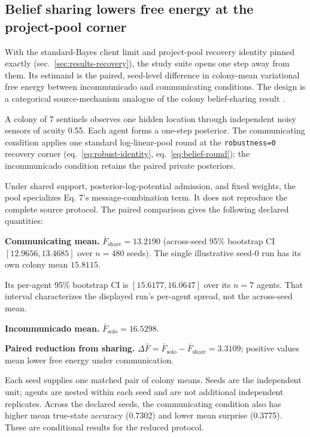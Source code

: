 \documentclass[
  english,
]{article}
\theoremstyle{plain}
\theoremstyle{definition}
\theoremstyle{remark}
\theoremstyle{definition}
\begin{document}
\subsection{Belief sharing lowers free energy at the project-pool
corner}\label{sec:results-belief_sharing}

With the standard-Bayes client limit and project-pool recovery identity
pinned exactly (sec.~\ref{sec:results-recovery}), the study suite opens
one step away from them. Its estimand is the paired, seed-level
difference in colony-mean variational free energy between incommunicado
and communicating conditions. The design is a categorical
source-mechanism analogue of the colony belief-sharing result
\citep{friston2024federated}.

A colony of 7 sentinels observes one hidden location through independent
noisy sensors of acuity 0.55. Each agent forms a one-step posterior. The
communicating condition applies one standard log-linear-pool round at
the \texttt{robustness=0} recovery corner (eq.~\ref{eq:robust-identity},
eq.~\ref{eq:belief-round}); the incommunicado condition retains the
paired private posteriors.

Under shared support, posterior-log-potential admission, and fixed
weights, the pool specializes Eq. 7's message-combination term. It does
not reproduce the complete source protocol. The paired comparison gives
the following declared quantities:

\textbf{Communicating mean.} \(\bar F_{\text{share}} = 13.2190\)
(across-seed 95\% bootstrap CI \([12.9656, 13.4685]\) over \(n = 480\)
seeds). The single illustrative seed-0 run has its own colony mean
\(15.8115\).

Its per-agent 95\% bootstrap CI is \([15.6177, 16.0647]\) over its
\(n = 7\) agents. That interval characterizes the displayed run's
per-agent spread, not the across-seed mean.

\textbf{Incommunicado mean.} \(\bar F_{\text{solo}} = 16.5298\).

\textbf{Paired reduction from sharing.}
\(\Delta \bar F = \bar F_{\text{solo}} - \bar F_{\text{share}}
= 3.3109\); positive values mean lower free energy under communication.

Each seed supplies one matched pair of colony means. Seeds are the
independent unit; agents are nested within each seed and are not
additional independent replicates. Across the declared seeds, the
communicating condition also has higher mean true-state accuracy
(0.7302) and lower mean surprise (0.3775). These are conditional results
for the reduced protocol.
\end{document}
